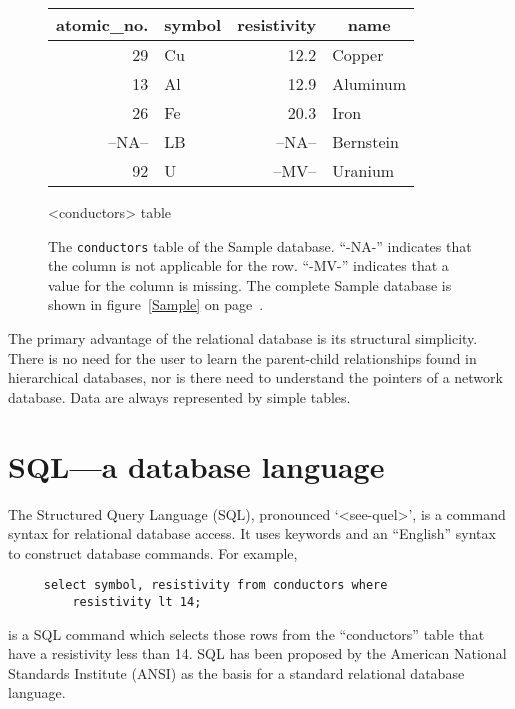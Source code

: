 \documentclass[11pt,a4paper]{report}
\def\I{\index}
\begin{document}
\begin{figure}[htp]
\begin{center}
  \begin{tabular}[t]{|r|l|r|l|}
     \hline
     \multicolumn{1}{|c|}{atomic\_no.}&
     \multicolumn{1}{|c|}{symbol}&
     \multicolumn{1}{|c|}{resistivity}&
     \multicolumn{1}{|c|}{name}\\
     \hline
    29& Cu& 12.2  & Copper\\
    13& Al& 12.9  & Aluminum\\
    26& Fe& 20.3  & Iron\\
--NA--& LB&--NA--& Bernstein\\
    92& U &--MV--  & Uranium\\
     \hline
  \end{tabular}
    \par  {<conductors> table }
  \end{center}
\smallskip
\caption[{\tt conductors} table of the Sample database]
    {The {\tt conductors} table of the Sample database.
    ``-NA-'' indicates that the column is not applicable for
    the row.
    ``-MV-'' indicates that a value for the column is missing.
    The complete Sample database is shown in figure~\ref{Sample}
    on page~\pageref{Sample}.}
   \label{Sample-conductor}
\end{figure}
 
 
The primary advantage of the relational database is its
structural simplicity.  There is no need for the user to
learn the parent-child relationships found in hierarchical
databases, nor is there need to understand the pointers
of a network database.
Data are always represented by simple tables.
 
 
 
 
 
 
 
\section{SQL---a database language}
\I{SQL}
The Structured Query Language (SQL), pronounced `<see-quel\/>',
is a command syntax for relational
database access.  It uses keywords and an ``English'' syntax
to construct database commands.  For example,
 
\begin{verbatim}
     select symbol, resistivity from conductors where
         resistivity lt 14;
\end{verbatim}
 
\noindent
is a SQL command which selects those rows from the ``conductors''
table that have a resistivity less than 14.
SQL has been proposed by the American National Standards Institute (ANSI)
\I{ANSI}
as the basis for a standard relational database language.
 
\end{document}
